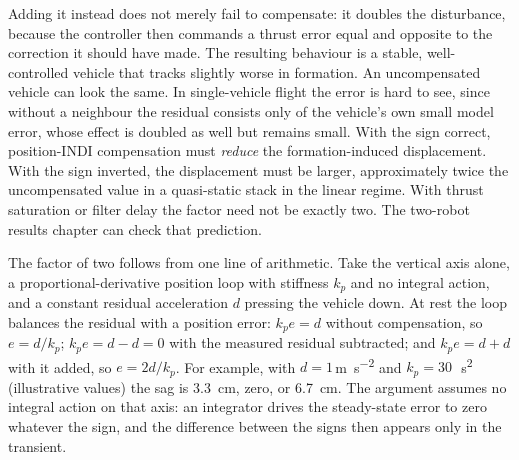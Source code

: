 Adding it instead does not merely fail to compensate: it doubles the disturbance, because the
controller then commands a thrust error equal and opposite to the correction it should have made.
The resulting behaviour is a stable, well-controlled vehicle that tracks slightly worse in
formation. An uncompensated vehicle can look the same. In single-vehicle flight the error is
hard to see, since without a neighbour the residual consists only of the vehicle's own small model
error, whose effect is doubled as well but remains small. With the sign
correct, position-INDI compensation must \emph{reduce} the formation-induced displacement. With
the sign inverted, the displacement must be larger, approximately twice the uncompensated value
in a quasi-static stack in the linear regime. With thrust saturation or filter delay the factor
need not be exactly two. The two-robot results chapter can check that prediction.

The factor of two follows from one line of arithmetic. Take the vertical axis alone, a
proportional-derivative position loop with stiffness $k_p$ and no integral action, and a constant
residual acceleration $d$ pressing the vehicle down. At rest the loop balances the residual with a
position error: $k_p e = d$ without compensation, so $e = d/k_p$; $k_p e = d - d = 0$ with the
measured residual subtracted; and $k_p e = d + d$ with it added, so $e = 2d/k_p$. For example, with
$d = 1$\,\si{\metre\per\second\squared} and $k_p = 30$\,\si{\per\second\squared} (illustrative
values) the sag is \SI{3.3}{\centi\metre}, zero, or \SI{6.7}{\centi\metre}. The argument assumes
no integral action on that axis: an integrator drives the steady-state error to zero whatever the
sign, and the difference between the signs then appears only in the transient.

